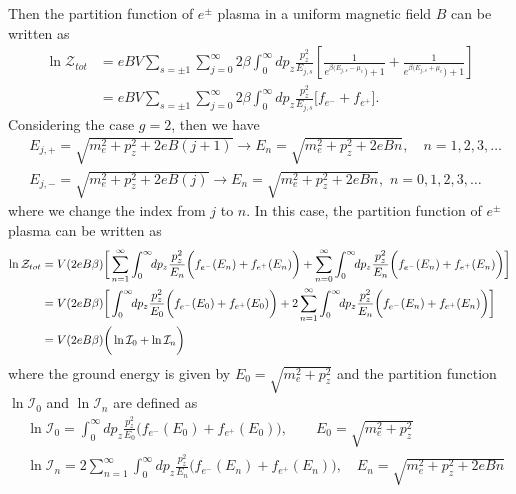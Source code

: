 \documentclass[sn-mathphys,Numbered]{sn-jnl}
\begin{document}
Then the partition function of $e^\pm$ plasma in a uniform magnetic field $B$ can be written as
\begin{align}
\ln\mathcal{Z}_{tot}&=eBV\sum_{s=\pm1}\sum_{j=0}^\infty2\beta\int_0^\infty\!\!dp_z \frac{p_z^2}{E_{j,s}}\left[\frac{1}{e^{\beta(E_{j,s}-\mu_e})+1}+\frac{1}{e^{\beta(E_{j,s}+\mu_e})+1}\right]\\
&=eBV\sum_{s=\pm1}\sum_{j=0}^\infty2\beta\int_0^\infty\!\!dp_z \frac{p_z^2}{E_{j,s}}\bigg[f_{e^-}+f_{e^+}\bigg].
\end{align}
Considering the case $g=2$, then we have
\begin{align}
&E_{j,+}=\sqrt{{m}_e^2+p^2_z+2eB\left(j+1\right)}\longrightarrow E_{n}=\sqrt{{m}_e^2+p^2_z+2eBn},\quad n=1,2,3,\dots\\
&E_{j,-}=\sqrt{{m}_e^2+p^2_z+2eB\left(j\right)}\longrightarrow E_{n}=\sqrt{{m}_e^2+p^2_z+2eBn},\,\, n=0,1,2,3,\dots
\end{align}
where we change the index from $j$ to $n$. In this case, the partition function of $e^\pm$ plasma can be written as
\begin{align}
\ln\mathcal{Z}_{tot}&=V(2eB\beta) \bigg[ \sum_{n=1}^\infty\int_0^\infty\!\!dp_z \frac{p_z^2}{E_{n}}\bigg(f_{e^-}(E_n)+f_{e^+}(E_n)\bigg)+\sum_{n=0}^\infty\int_0^\infty\!\!dp_z \frac{p_z^2}{E_{n}}\bigg(f_{e^-}(E_n)+f_{e^+}(E_n)\bigg)\bigg]\notag\\
&=V(2eB\beta) \bigg[\int_0^\infty\!\!dp_z \frac{p_z^2}{E_0}\bigg(f_{e^-}(E_0)+f_{e^+}(E_0)\bigg)+2 \sum_{n=1}^\infty\int_0^\infty\!\!dp_z \frac{p_z^2}{E_{n}}\bigg(f_{e^-}(E_n)+f_{e^+}(E_n)\bigg)\bigg]\notag\\
&=V(2eB\beta)\bigg(\ln\mathcal{I}_{0}+\ln\mathcal{I}_{n}\bigg)
\end{align}
where the ground energy is given by $E_0=\sqrt{{m}_e^2+p^2_z}$ and the partition function $\ln\mathcal{I}_{0}$ and $\ln\mathcal{I}_{n}$ are defined as
\begin{align}
&\ln\mathcal{I}_{0}=\int_0^\infty\!\!dp_z \frac{p_z^2}{E_0}\bigg(f_{e^-}(E_0)+f_{e^+}(E_0)\bigg),\qquad E_0=\sqrt{{m}_e^2+p^2_z} \\
&\ln\mathcal{I}_{n}=2 \sum_{n=1}^\infty\int_0^\infty\!\!dp_z \frac{p_z^2}{E_{n}}\bigg(f_{e^-}(E_n)+f_{e^+}(E_n)\bigg),\quad E_n=\sqrt{{m}_e^2+p^2_z+2eBn}
\end{align}
\end{document}
